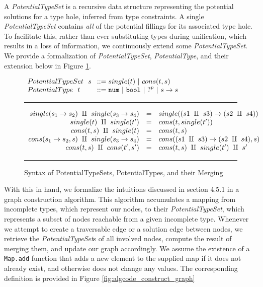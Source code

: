 A \textit{PotentialTypeSet} is a recursive data structure representing the potential solutions for a type hole, inferred from type constraints. A single \emph{PotentialTypeSet} contains \emph{all} of the potential fillings for its associated type hole. To facilitate this, rather than ever substituting types during unification, which results in a loss of information, we continuously extend some \emph{PotentialTypeSet}. We provide a formalization of \textit{PotentialTypeSet}, \textit{PotentialType}, and their extension below in Figure \ref{fig:possible_type_sets}.

\begin{figure}[hbt!]
\centering
\vspace{-3px} 
$\arraycolsep=4pt\begin{array}{lll}
PotentialTypeSet~~ s & ::= 
single(t) ~\vert~ 
cons(t, s)
\\
PotentialType~~ t & ::= 
  \tnum ~\vert~
  \tbool ~\vert~
  \tehole^p ~\vert~
  \tarr{s}{s}
  \\
\end{array}$
\label{fig:syntax_possible_type_sets}
\vspace{5px}
\hrule
\[\begin{array}{rcl}
    single(s_1 \rightarrow s_2) ~\amalg~ single(s_3 \rightarrow s_4) & = & single({(s1 ~\amalg~ s3) \rightarrow (s2 ~\amalg~ s4)}) \\
    single(t) ~\amalg~ single(t') & = & cons(t, single(t')) \\
    cons(t,s) ~\amalg~ single(t) & = & cons(t, s) \\
    cons(s_1 \rightarrow s_2, s) ~\amalg~ single(s_3 \rightarrow s_4) & = & cons((s1 ~\amalg~ s3) \rightarrow (s2 ~\amalg~ s4) , s) \\
    cons(t,s) ~\amalg~ cons(t',s') & = & cons(t,s) ~\amalg~ single(t') ~\amalg~ s' \\
\end{array}\] 
\caption{Syntax of PotentialTypeSets, PotentialTypes, and their Merging}
\vspace{5px} 
\hrule
\label{fig:possible_type_sets}
\vspace{-5px}
\end{figure}

With this in hand, we formalize the intuitions discussed in section 4.5.1 in a graph construction algorithm. This algorithm accumulates a mapping from incomplete types, which represent our nodes, to their \emph{PotentialTypeSet}, which represents a subset of nodes reachable from a given incomplete type. Whenever we attempt to create a traversable edge or a solution edge between nodes, we retrieve the \emph{PotentialTypeSet}s of all involved nodes, compute the result of merging them, and update our graph accordingly. We assume the existence of a \lstinline{Map.add} function that adds a new element to the supplied map if it does not already exist, and otherwise does not change any values. The corresponding definition is provided in Figure \ref{fig:algcode_construct_graph}

